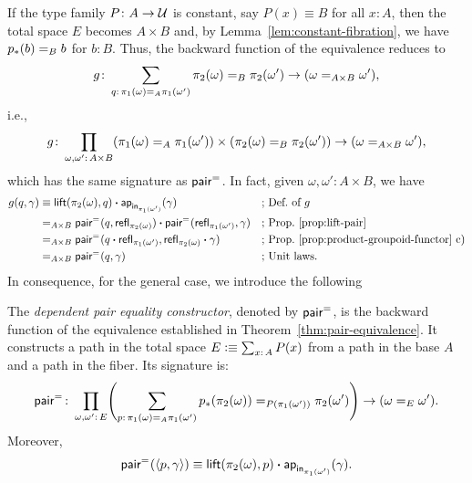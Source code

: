 \begin{rem}\label{rem:total-space-of-constant}
    If the type family $P\colon A\to\univ$ is constant, say $P(x)\equiv B$ for all $x\colon A$, then the total space $E$ becomes $A\times B$ and, by Lemma~\ref{lem:constant-fibration}, we have $p_*(b)\mathrel{=_{B}}b$ for $b\colon B$. Thus, the backward function of the equivalence reduces to
    \[
        g\colon\sum_{q\colon\pi_1(\omega)\eq A\pi_1(\omega')}
            \pi_2(\omega)\eq B\pi_2(\omega')
            \to(\omega\eq{A\times B}\omega'),
    \]
    i.e.,
    \[
        g\colon\prod_{\omega,\omega'\colon A\times B}
        (\pi_1(\omega)\eq A\pi_1(\omega'))
            \times(\pi_2(\omega)\eq B\pi_2(\omega'))
            \to
            (\omega\eq{A\times B}\omega'),
    \]
    which has the same signature as $\mathsf{pair}^{\mathrel{=_{}}}$. In fact, given $\omega,\omega'\colon A\times B$, we have
    \begin{align*}
        g(q,\gamma)
            &\equiv \mathsf{lift}(\pi_2(\omega),q)
                \mathbin{\boldsymbol{\cdot}}\mathsf{ap}_{\mathsf{in}_{\pi_1(\omega')}}(\gamma)
                    &&\text{; Def.\ of }g \\
            &\mathrel{=_{A\times B}}\mathsf{pair}^{\mathrel{=_{}}}
                (q,\mathsf{refl}_{\pi_2(\omega)})
                \mathbin{\boldsymbol{\cdot}}
                \mathsf{pair}^{\mathrel{=_{}}}(\mathsf{refl}_{\pi_1(\omega')},\gamma)
                    &&\text{; Prop.~\ref{prop:lift-pair}}\\
            &\mathrel{=_{A\times B}}\mathsf{pair}^{\mathrel{=_{}}}(q
                \mathbin{\boldsymbol{\cdot}} \mathsf{refl}_{\pi_1(\omega')}, 
                \mathsf{refl}_{\pi_2(\omega)}\mathbin{\boldsymbol{\cdot}}\gamma)
                    &&\text{; Prop.~\ref{prop:product-groupoid-functor} c)}\\
            &\mathrel{=_{A\times B}}\mathsf{pair}^{\mathrel{=_{}}}(q,\gamma)
                    &&\text{; Unit laws.}
    \end{align*}
    In consequence, for the general case, we introduce the following
\end{rem}

\begin{defn}\label{defn:Sigma-pair}
    The \textsl{dependent pair equality constructor}, denoted by\/ $\mathsf{pair}^{\mathrel{=_{}}}$, is the backward function of the equivalence established in Theorem~\ref{thm:pair-equivalence}. It constructs a path in the total space $E\defeq\sum_{x\colon A}P(x)$ from a path in the base $A$ and a path in the fiber. Its signature is:
    \[
        \fun{pair}^{\eq{}}\colon \prod_{\omega,\omega'\colon E}
        \Biggl(
            \sum_{p\colon\pi_1(\omega)\eq A\pi_1(\omega')}
                p_*(\pi_2(\omega))\eq{P(\pi_1(\omega'))}\pi_2(\omega')
        \Biggr)
        \to(\omega\eq E\omega').
    \]
    Moreover,
    \[
        \mathsf{pair}^{\mathrel{=_{}}}(\langle p,\gamma\rangle)
            \equiv\mathsf{lift}(\pi_2(\omega),p)
            \mathbin{\boldsymbol{\cdot}}\mathsf{ap}_{\mathsf{in}_{\pi_1(\omega')}}(\gamma).
    \]
\end{defn}

